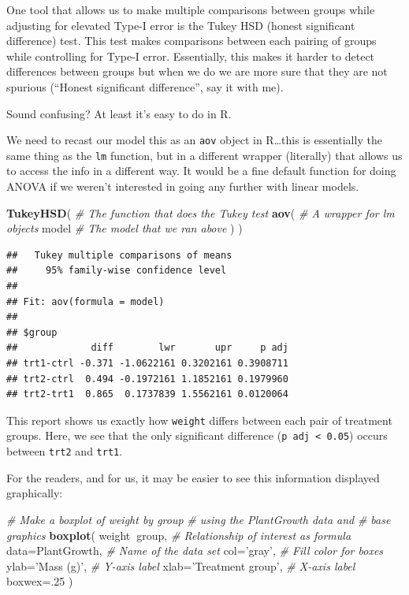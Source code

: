 \documentclass[
]{book}
\newenvironment{Shaded}{\begin{snugshade}}{\end{snugshade}}
\newcommand{\CommentTok}[1]{\textcolor[rgb]{0.56,0.35,0.01}{\textit{#1}}}
\newcommand{\DataTypeTok}[1]{\textcolor[rgb]{0.13,0.29,0.53}{#1}}
\newcommand{\DecValTok}[1]{\textcolor[rgb]{0.00,0.00,0.81}{#1}}
\newcommand{\KeywordTok}[1]{\textcolor[rgb]{0.13,0.29,0.53}{\textbf{#1}}}
\newcommand{\NormalTok}[1]{#1}
\newcommand{\OperatorTok}[1]{\textcolor[rgb]{0.81,0.36,0.00}{\textbf{#1}}}
\newcommand{\StringTok}[1]{\textcolor[rgb]{0.31,0.60,0.02}{#1}}
\begin{document}
One tool that allows us to make multiple comparisons between groups while adjusting for elevated Type-I error is the Tukey HSD (honest significant difference) test. This test makes comparisons between each pairing of groups while controlling for Type-I error. Essentially, this makes it harder to detect differences between groups but when we do we are more sure that they are not spurious (``Honest significant difference'', say it with me).

Sound confusing? At least it's easy to do in R.

We need to recast our model this as an \texttt{aov} object in R\ldots this is essentially the same thing as the \texttt{lm} function, but in a different wrapper (literally) that allows us to access the info in a different way. It would be a fine default function for doing ANOVA if we weren't interested in going any further with linear models.

\begin{Shaded}
\begin{Highlighting}[]
\KeywordTok{TukeyHSD}\NormalTok{(    }\CommentTok{# The function that does the Tukey test}
  \KeywordTok{aov}\NormalTok{(       }\CommentTok{# A wrapper for lm objects}
\NormalTok{    model    }\CommentTok{# The model that we ran above}
\NormalTok{    )}
\NormalTok{  )}
\end{Highlighting}
\end{Shaded}

\begin{verbatim}
##   Tukey multiple comparisons of means
##     95% family-wise confidence level
## 
## Fit: aov(formula = model)
## 
## $group
##             diff        lwr       upr     p adj
## trt1-ctrl -0.371 -1.0622161 0.3202161 0.3908711
## trt2-ctrl  0.494 -0.1972161 1.1852161 0.1979960
## trt2-trt1  0.865  0.1737839 1.5562161 0.0120064
\end{verbatim}

This report shows us exactly how \texttt{weight} differs between each pair of treatment groups. Here, we see that the only significant difference (\texttt{p\ adj\ \textless{}\ 0.05}) occurs between \texttt{trt2} and \texttt{trt1}.

For the readers, and for us, it may be easier to see this information displayed graphically:

\begin{Shaded}
\begin{Highlighting}[]
\CommentTok{# Make a boxplot of weight by group}
\CommentTok{# using the PlantGrowth data and }
\CommentTok{# base graphics}
\KeywordTok{boxplot}\NormalTok{(}
\NormalTok{  weight}\OperatorTok{~}\NormalTok{group,           }\CommentTok{# Relationship of interest as formula}
  \DataTypeTok{data=}\NormalTok{PlantGrowth,       }\CommentTok{# Name of the data set}
  \DataTypeTok{col=}\StringTok{'gray'}\NormalTok{,             }\CommentTok{# Fill color for boxes}
  \DataTypeTok{ylab=}\StringTok{'Mass (g)'}\NormalTok{,        }\CommentTok{# Y-axis label}
  \DataTypeTok{xlab=}\StringTok{'Treatment group'}\NormalTok{, }\CommentTok{# X-axis label}
  \DataTypeTok{boxwex=}\NormalTok{.}\DecValTok{25}
\NormalTok{  )}
\end{Highlighting}
\end{Shaded}
\end{document}
